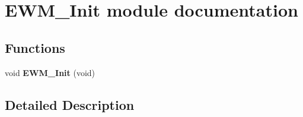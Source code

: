 \hypertarget{group___e_w_m___init__module}{}\section{E\+W\+M\+\_\+\+Init module documentation}
\label{group___e_w_m___init__module}
\subsection*{Functions}
\begin{DoxyCompactItemize}
\item 
void {\bfseries E\+W\+M\+\_\+\+Init} (void)\hypertarget{group___e_w_m___init__module_gada5a58847709962aa855aceeae604786}{}\label{group___e_w_m___init__module_gada5a58847709962aa855aceeae604786}

\end{DoxyCompactItemize}


\subsection{Detailed Description}
